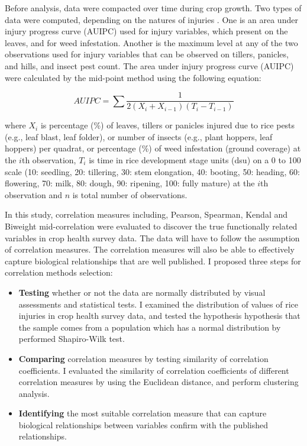 

Before analysis, data were compacted over time during crop growth. Two types of data were computed, depending on the natures of injuries \citet{Savary_2009_Survey}. One is an area under injury progress curve (AUIPC) used for injury variables, which present on the leaves, and for weed infestation. Another is the maximum level at any of the two observations used for injury variables that can be observed on tillers, panicles, and hills, and insect pest count. The area under injury progress curve (AUIPC) \citep{Campbell_1990_Introduction} were calculated by the mid-point method using the following equation: 

\begin{equation}
AUIPC = \sum{\frac{1}{2(X_{i} + X_{i-1})(T_{i} - T_{i-1})}}
\end{equation}

where $X_i$ is percentage (\%) of leaves, tillers or panicles injured due to rice pests (e.g., leaf blast, leaf folder), or number of insects (e.g., plant hoppers, leaf hoppers) per quadrat, or percentage (\%) of weed infestation (ground coverage) at the $i$th observation, $T_i$ is time in rice development stage units (dsu) on a 0 to 100 scale (10: seedling, 20: tillering, 30: stem elongation, 40: booting, 50: heading, 60: flowering, 70: milk, 80: dough, 90: ripening, 100: fully mature) at the $i$th observation and $n$ is total number of observations.

In this study, correlation measures including, Pearson, Spearman, Kendal and Biweight mid-correlation \citep{Wilcox_2012_Introduction} were evaluated to discover the true functionally related variables in crop health survey data. The data will have to follow the assumption of correlation measures. The correlation measures will also be able to effectively capture biological relationships that are well published. I proposed three steps for correlation methods selection: 

\begin{itemize}
\item \textbf{Testing} whether or not the data are normally distributed by visual assessments and statistical tests. I examined the distribution of values of rice injuries in crop health survey data, and tested the hypothesis hypothesis that the sample comes from a population which has a normal distribution by performed Shapiro-Wilk test.
\item \textbf{Comparing} correlation measures by testing similarity of correlation coefficients. I evaluated the similarity of correlation coefficients of different correlation measures by using the Euclidean distance, and perform clustering analysis.
\item \textbf{Identifying} the most suitable correlation measure that can capture biological relationships between variables confirm with the published relationships.
\end{itemize}

